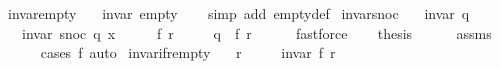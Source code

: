 \begin{isabellebody}
%
\endisatagproof
{\isafoldproof}%
%
\isadelimproof
\isanewline
%
\endisadelimproof
%
\isadeliminvisible
\isanewline
%
\endisadeliminvisible
%
\isataginvisible
{}\isamarkupfalse%
\ invar{\isacharunderscore}{\kern0pt}empty{\isacharcolon}{\kern0pt}\isanewline
\ \ \ {\isachardoublequoteopen}invar\ empty{\isachardoublequoteclose}%
\endisataginvisible
{\isafoldinvisible}%
%
\isadeliminvisible
\isanewline
%
\endisadeliminvisible
%
\isadelimproof
\ \ %
\endisadelimproof
%
\isatagproof
{}\isamarkupfalse%
\ {\isacharparenleft}{\kern0pt}simp\ add{\isacharcolon}{\kern0pt}\ empty{\isacharunderscore}{\kern0pt}def{\isacharparenright}{\kern0pt}%
\endisatagproof
{\isafoldproof}%
%
\isadelimproof
\isanewline
%
\endisadelimproof
%
\isadeliminvisible
\isanewline
%
\endisadeliminvisible
%
\isataginvisible
{}\isamarkupfalse%
\ invar{\isacharunderscore}{\kern0pt}snoc{\isacharcolon}{\kern0pt}\isanewline
\ \ \ {\isachardoublequoteopen}invar\ q{\isachardoublequoteclose}\isanewline
\ \ \ {\isachardoublequoteopen}invar\ {\isacharparenleft}{\kern0pt}snoc\ q\ x{\isacharparenright}{\kern0pt}{\isachardoublequoteclose}%
\endisataginvisible
{\isafoldinvisible}%
%
\isadeliminvisible
\isanewline
%
\endisadeliminvisible
%
\isadelimproof
%
\endisadelimproof
%
\isatagproof
{}\isamarkupfalse%
\ {\isacharminus}{\kern0pt}\isanewline
\ \ \isamarkupfalse%
\ f\ r\ \isanewline
\ \ \ \ {\isachardoublequoteopen}q\ {\isacharequal}{\kern0pt}\ {\isacharparenleft}{\kern0pt}f{\isacharcomma}{\kern0pt}\ r{\isacharparenright}{\kern0pt}{\isachardoublequoteclose}\isanewline
\ \ \ \ \isamarkupfalse%
\ fastforce\isanewline
\ \ \isamarkupfalse%
\ {\isacharquery}{\kern0pt}thesis\isanewline
\ \ \ \ \isamarkupfalse%
\ assms\isanewline
\ \ \ \ \isamarkupfalse%
\ {\isacharparenleft}{\kern0pt}cases\ f{\isacharparenright}{\kern0pt}\ auto\isanewline
{}\isamarkupfalse%
%
\endisatagproof
{\isafoldproof}%
%
\isadelimproof
\isanewline
%
\endisadelimproof
%
\isadeliminvisible
\isanewline
%
\endisadeliminvisible
%
\isataginvisible
{}\isamarkupfalse%
\ invar{\isacharunderscore}{\kern0pt}if{\isacharunderscore}{\kern0pt}r{\isacharunderscore}{\kern0pt}empty{\isacharcolon}{\kern0pt}\isanewline
\ \ \ {\isachardoublequoteopen}r\ {\isacharequal}{\kern0pt}\ {\isacharbrackleft}{\kern0pt}{\isacharbrackright}{\kern0pt}{\isachardoublequoteclose}\isanewline
\ \ \ {\isachardoublequoteopen}invar\ {\isacharparenleft}{\kern0pt}f{\isacharcomma}{\kern0pt}\ r{\isacharparenright}{\kern0pt}{\isachardoublequoteclose}%

\end{isabellebody}
